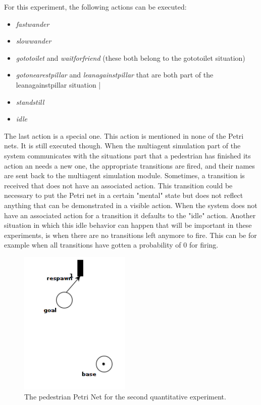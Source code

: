 \documentclass[11pt]{book}
\begin{document}
For this experiment, the following actions can be executed:
\begin{itemize}
\item \emph{fastwander}
\item \emph{slowwander}
\item \emph{gototoilet} and \emph{waitforfriend} (these both belong to the gototoilet situation)
\item \emph{gotonearestpillar} and \emph{leanagainstpillar} that are both part of the leanagainstpillar situation |
\item \emph{standstill}
\item \emph{idle}
\end{itemize}
The last action is a special one. This action is mentioned in none of the Petri nets. It is still executed though. When the multiagent simulation part of the system communicates with the situations part that a pedestrian has finished its action an needs a new one, the appropriate transitions are fired, and their names are sent back to the multiagent simulation module. Sometimes, a transition is received that does not have an associated action. This transition could be necessary to put the Petri net in a certain "mental" state but does not reflect anything that can be demonstrated in a visible action.  When the system does not have an associated action for a transition it defaults to the "idle" action. Another situation in which this idle behavior can happen that will be important in these experiments, is when there are no transitions left anymore to fire. This can be for example when all transitions have gotten a probability of 0 for firing.

\begin{figure}
\centering
\includegraphics[width=150pt]{"rotterdamPedestrianNet_secondexperiment"}
\caption{The pedestrian Petri Net for the second quantitative experiment.}
\label{fig:second_rotterdampedestriannet}
\end{figure}
\end{document}
